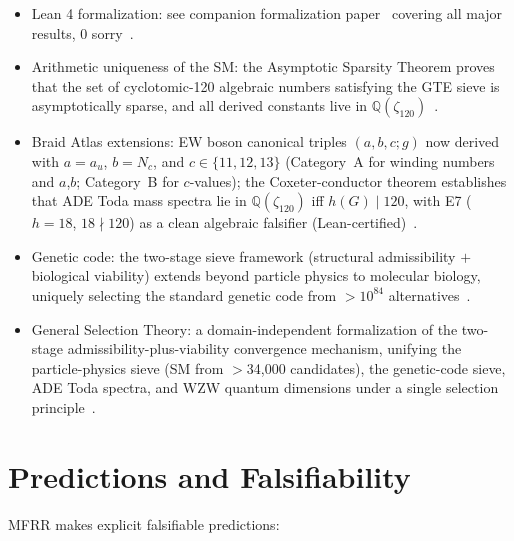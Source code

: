 \documentclass[11pt]{article}
\theoremstyle{plain}
\theoremstyle{definition}
\theoremstyle{remark}
\begin{document}
\begin{itemize}[nosep]
\item Lean 4 formalization: see companion formalization paper~\cite{SpivackUGPFormalization} covering all major results, 0 sorry~\cite{SpivackUGPFormalization,ugp-lean}.
\item Arithmetic uniqueness of the SM: the Asymptotic Sparsity Theorem proves that the set of
  cyclotomic-120 algebraic numbers satisfying the GTE sieve is asymptotically sparse,
  and all derived constants live in $\mathbb{Q}(\zeta_{120})$~\cite{Spivack2026_Uniqueness25}.
\item Braid Atlas extensions: EW boson canonical triples $(a,b,c;g)$ now derived with
  $a = a_u$, $b = N_c$, and $c \in \{11,12,13\}$ (Category~A for winding numbers and $a$,$b$;
  Category~B for $c$-values);
  the Coxeter-conductor theorem establishes that ADE Toda mass spectra lie in
  $\mathbb{Q}(\zeta_{120})$ iff $h(G) \mid 120$, with E7 ($h=18$, $18\nmid 120$)
  as a clean algebraic falsifier (Lean-certified)~\cite{Spivack2025_BraidAtlas}.
\item Genetic code: the two-stage sieve framework (structural admissibility $+$ biological
  viability) extends beyond particle physics to molecular biology, uniquely selecting the
  standard genetic code from $>10^{84}$ alternatives~\cite{SpivackGeneticCode}.
\item General Selection Theory: a domain-independent formalization of the two-stage
  admissibility-plus-viability convergence mechanism, unifying the particle-physics sieve
  (SM from $>$34,000 candidates), the genetic-code sieve, ADE Toda spectra,
  and WZW quantum dimensions under a single selection principle~\cite{SpivackGeneralSelection}.
\end{itemize}

\section{Predictions and Falsifiability}
\label{sec:predictions}

MFRR makes explicit falsifiable predictions:
\end{document}

